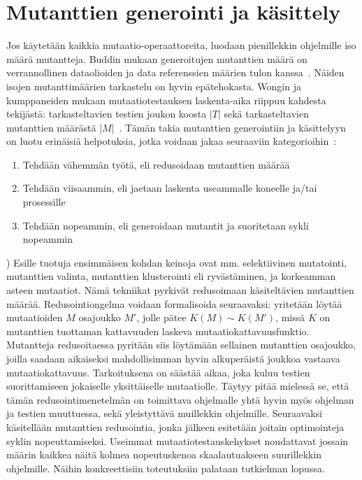 \documentclass{tktltiki}
\begin{document}
\section{Mutanttien generointi ja käsittely}
Jos käytetään kaikkia mutaatio-operaattoreita, luodaan pienillekkin ohjelmille iso määrä mutantteja. Buddin mukaan generoitujen mutanttien määrä on verrannollinen dataolioiden ja data referenssien määrien tulon kanssa~\cite{}. Näiden isojen mutanttimäärien tarkastelu on hyvin epätehokasta. Wongin ja kumppaneiden mukaan mutaatiotestauksen laskenta-aika riippuu kahdesta tekijästä: tarkasteltavien testien joukon koosta $|T|$ sekä tarkasteltavien mutanttien määrästä $|M|$~\cite{}. Tämän takia mutanttien generointiin ja käsittelyyn on luotu erinäisiä helpotuksia, jotka voidaan jakaa seuraaviin kategorioihin~\cite{Hussain08}:
\begin{enumerate}
\item Tehdään vähemmän työtä, eli redusoidaan mutanttien määrää
\item Tehdään viisaammin, eli jaetaan laskenta useammalle koneelle ja/tai prosessille
\item Tehdään nopeammin, eli generoidaan mutantit ja suoritetaan sykli nopeammin
\end{enumerate})
Esille tuotuja ensimmäisen kohdan keinoja ovat mm. selektiivinen mutatointi, mutanttien valinta, mutanttien klusterointi eli ryvästäminen, ja korkeamman asteen mutaatiot. Nämä tekniikat pyrkivät redusoimaan käsiteltävien mutanttien määrää. Redusointiongelma voidaan formalisoida seuraavaksi: yritetään löytää mutaatioiden $M$ osajoukko $M'$, jolle pätee $K(M) \sim K(M')$, missä $K$ on mutanttien tuottaman kattavuuden laskeva mutaatiokattavuusfunktio. Mutantteja redusoitaessa pyritään siis löytämään sellainen mutanttien osajoukko, joilla saadaan aikaiseksi mahdollisimman hyvin alkuperäistä joukkoa vastaava mutaatiokattavuus. Tarkoituksena on säästää aikaa, joka kuluu testien suorittamiseen jokaiselle yksittäiselle mutaatiolle. Täytyy pitää mielessä se, että tämän redusointimenetelmän on toimittava ohjelmalle yhtä hyvin myös ohjelman ja testien muuttuessa, sekä yleistyttävä muillekkin ohjelmille. Seuraavaksi käsitellään mutanttien redusointia, jonka jälkeen esitetään joitain optimointeja syklin nopeuttamiseksi. Useimmat mutaatiotestauskehykset noudattavat jossain määrin kaikkea näitä kolmea nopeutuskenoa skaalautuakseen suurillekkin ohjelmille. Näihin konkreettisiin toteutuksiin palataan tutkielman lopussa.
\end{document}
